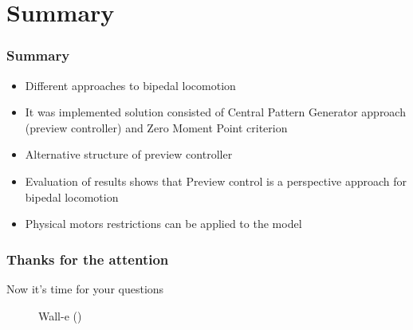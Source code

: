 \documentclass{beamer}
\begin{document}
	\section*{Summary}
	\begin{frame}
		\frametitle{Summary}
		\begin{itemize}
			\item
				Different approaches to bipedal locomotion
			\item
				It was implemented solution consisted of Central Pattern Generator approach (preview controller) and Zero Moment Point criterion
			\item
				Alternative structure of preview controller
			\item
				Evaluation of results shows that Preview control is a perspective approach for bipedal locomotion
			\item
				Physical motors restrictions can be applied to the model
		\end{itemize}
	\end{frame}


	\begin{frame}
		\frametitle{Thanks for the attention}
		Now it's time for your questions
		\begin{figure}[h]
			 \caption{Wall-e (\cite{walle})}
		\end{figure}
	\end{frame}
	
	
\end{document}
